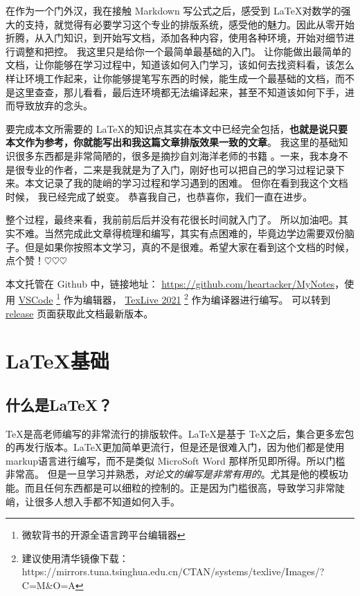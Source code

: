 \documentclass[UTF8,AutoFakeBold]{ctexart}
\numberwithin{figure}{section}
\numberwithin{table}{section}
\begin{document}
在作为一个门外汉，我在接触 Markdown 写公式之后，感受到 \LaTeX 对数学的强大的支持，就觉得有必要学习这个专业的排版系统，感受他的魅力。因此从零开始折腾，从入门知识，到开始写文档，添加各种内容，使用各种环境，开始对细节进行调整和把控。 我这里只是给你一个最简单最基础的入门。 让你能做出最简单的文档，让你能够在学习过程中，知道该如何入门学习，该如何去找资料看，该怎么样让环境工作起来，让你能够提笔写东西的时候，能生成一个最基础的文档，而不是这里查查，那儿看看，最后连环境都无法编译起来，甚至不知道该如何下手，进而导致放弃的念头。

要完成本文所需要的 \LaTeX 的知识点其实在本文中已经完全包括，\textbf{也就是说只要本文作为参考，你就能写出和我这篇文章排版效果一致的文章}。 我这里的基础知识很多东西都是非常简陋的，很多是摘抄自刘海洋老师的书籍 \cite{latex_start}。一来，我本身不是很专业的作者，二来是我就是为了入门，刚好也可以把自己的学习过程记录下来。本文记录了我的陡峭的学习过程和学习遇到的困难。 但你在看到我这个文档时候， 我已经完成了蜕变。 恭喜我自己，也恭喜你，我们一直在进步。

整个过程，最终来看，我前前后后并没有花很长时间就入门了。 所以加油吧。其实不难。当然完成此文章得梳理和编写，其实有点困难的，毕竟边学边需要双份脑子。但是如果你按照本文学习，真的不是很难。希望大家在看到这个文档的时候，点个赞！$\heartsuit$$\heartsuit$$\heartsuit$

本文托管在 Github 中，链接地址： \href{https://github.com/heartacker/MyNotes}{https://github.com/heartacker/MyNotes}，使用 \href{https://code.visualstudio.com/}{VSCode} \footnote{微软背书的开源全语言跨平台编辑器} 作为编辑器， \href{https://tug.org/texlive/}{TexLive 2021} \footnote{建议使用清华镜像下载： https://mirrors.tuna.tsinghua.edu.cn/CTAN/systems/texlive/Images/?C=M\&O=A} 作为编译器进行编写。 可以转到 \href{https://github.com/heartacker/MyNotes/releases}{release} 页面获取此文档最新版本。

\clearpage


\begin{abstract}
    本文是记录在学习 \LaTeX 过程中遇到的问题和解决办法，并用 \LaTeX 写出来。 本文所涉及到的内容足够你完成和本文一样的输出效果。



\end{abstract}

\section{\LaTeX 基础}
\label{sec:knowledge}

\subsection{什么是\LaTeX？}
\TeX 是高老师编写的非常流行的排版软件。\LaTeX 是基于 \TeX 之后，集合更多宏包的再发行版本。\LaTeX 更加简单更流行，但是还是很难入门，因为他们都是使用markup语言进行编写，而不是类似 MicroSoft Word 那样所见即所得。所以门槛非常高。
但是一旦学习并熟悉，\emph{对论文的编写是非常有用的}。尤其是他的模板功能。而且任何东西都是可以细粒的控制的。正是因为门槛很高，导致学习非常陡峭，让很多人想入手都不知道如何入手。
\end{document}
